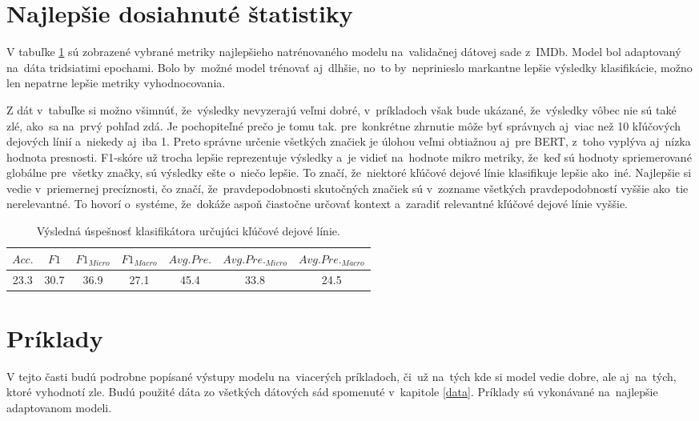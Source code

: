 \section{Najlepšie dosiahnuté štatistiky}
V tabuľke \ref{vysledky} sú zobrazené vybrané metriky najlepšieho natrénovaného modelu na~validačnej dátovej sade z~IMDb. Model bol adaptovaný na~dáta tridsiatimi epochami. Bolo by~možné model trénovať aj~dlhšie, no~to by~neprinieslo markantne lepšie výsledky klasifikácie, možno len nepatrne lepšie metriky vyhodnocovania.

Z dát v~tabuľke si možno všimnúť, že~výsledky nevyzerajú veľmi dobré, v~príkladoch však bude ukázané, že~výsledky vôbec nie sú také zlé, ako~sa na~prvý pohľad zdá. Je pochopiteľné prečo je tomu tak. pre~konkrétne zhrnutie môže byť správnych aj~viac než 10 kľúčových dejových línií a~niekedy aj~iba 1. Preto správne určenie všetkých značiek je úlohou veľmi obtiažnou aj~pre BERT, z~toho vyplýva aj~nízka hodnota presnosti. F1-skóre už trocha lepšie reprezentuje výsledky a~je vidieť na~hodnote mikro metriky, že~keď sú hodnoty spriemerované globálne pre~všetky značky, sú výsledky ešte o~niečo lepšie. To značí, že~niektoré kľúčové dejové línie klasifikuje lepšie ako~iné. Najlepšie si vedie v~priemernej precíznosti, čo značí, že~pravdepodobnosti skutočných značiek sú v~zozname všetkých pravdepodobností vyššie ako~tie nerelevantné. To hovorí o~systéme, že~dokáže aspoň čiastočne určovať kontext a~zaradiť relevantné kľúčové dejové línie vyššie. 


\begin{table}[hbt]
\centering
\caption{Výsledná úspešnosť klasifikátora určujúci kľúčové dejové línie.}
\label{vysledky}
\begin{tabular}{|c|c|c|c|c|c|c|}
\hline
\(Acc.\) & \(F1\) & \(F1_{Micro}\) & \(F1_{Macro}\) & \(Avg. Pre.\) & \(Avg. Pre._{Micro}\) &  \(Avg. Pre._{Macro}\) \\
\hline
23.3 & 30.7 & 36.9 & 27.1 & 45.4 & 33.8 & 24.5 \\ 
\hline

\end{tabular}
\end{table}

\section{Príklady}

V tejto časti budú podrobne popísané výstupy modelu na~viacerých príkladoch, či~už na~tých kde si model vedie dobre, ale aj~na~tých, ktoré vyhodnotí zle. Budú použité dáta zo všetkých dátových sád spomenuté v~kapitole \ref{data}. Príklady sú vykonávané na~najlepšie adaptovanom modeli. 

